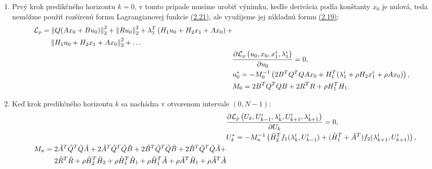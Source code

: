 \begin{enumerate}
	\item{Prvý krok predikčného horizontu $k = 0$, v tomto prípade musíme urobiť výnimku, keďže derivácia podla konštanty $x_0$ je nulová, teda nemôžme použiť rozšírenú formu Lagrangianovej funkcie \hyperref[math:RozsirenyLag]{(2.21)}, ale využijeme jej základnú formu  \hyperref[math:RozsirenyLag]{(2.19)}:\\
		\begin{subequations}
			\begin{align}
				\begin{split}
					&\mathcal{L}_{\rho} =\left\lVert Q(Ax_{0}+Bu_{0})\right\rVert^{2}_{2}+\left\lVert Ru_{0}\right\rVert^{2}_{2} +\lambda_{1}^{T}\left(H_{1}u_{0} + H_{2}x_{1} + Ax_{0} \right)+\\&\hspace{0.8cm}\left\lVert H_{1}u_{0} + H_{2}x_{1} + Ax_{0}\right\rVert_{2}^{2}+\dots
				\end{split}\\
				&\frac{\partial \mathcal{L}_{\rho}\left(u_{0},x_{0},x_{1}^{i},\lambda_{1}^{i}\right)}{\partial u_{0}} = 0,\\
				&u_{0}^{*} = -M_{0}^{-1}\left(2B^{T}Q^{T}QAx_{0}+H_{1}^{T}(\lambda_{1}^{i}+\rho H_{2}x_{1}^{i}+\rho Ax_{0})\right),\\
				&M_{0} = 2B^{T}Q^{T}QB + 2R^{T}R +\rho H_{1}^{T}H_{1}.
			\end{align}
		\end{subequations}
	}
	\item{Keď krok predikčného horizontu $k$ sa nachádza v otvorenom intervale $\left(0,N-1\right)$:\\
		\begin{subequations}
			\begin{align}
				&\frac{\partial \mathcal{L}_{\rho}\left(U_{k},U_{k-1}^{i},\lambda_{k}^{i},U_{k+1}^{i},\lambda_{k+1}^{i}\right)}{\partial U_{k}} = 0,\\
				&U_{k}^{*} = -M_{n}^{-1}\left(\tilde{H}_{2}^{T}f_{1}(\lambda_{k}^{i},U_{k-1}^{i})+(\tilde{H}_{1}^{T}+\tilde{A}^{T})f_{2}(\lambda_{k+1}^{i},U_{k+1}^{i})\right),\\
				\begin{split}
					& M_{n} = 2\tilde{A}^{T}\tilde{Q}^{T}\tilde{Q}\tilde{A}+2\tilde{A}^{T}\tilde{Q}^{T}\tilde{Q}\tilde{B}+2\tilde{B}^{T}\tilde{Q}^{T}\tilde{Q}\tilde{B}+2\tilde{B}^{T}\tilde{Q}^{T}\tilde{Q}\tilde{A}+\\
					&\hspace{1.0cm}2\tilde{R}^{T}\tilde{R} + \rho\tilde{H}_{2}^{T}\tilde{H}_{2}+ \rho\tilde{H}_{1}^{T}\tilde{H}_{1} + \rho\tilde{H}_{1}^{T}\tilde{A} + \rho\tilde{A}^{T}\tilde{H}_{1}+ \rho\tilde{A}^{T}\tilde{A}

\end{split}
\end{align}
\end{subequations}}
\end{enumerate}
